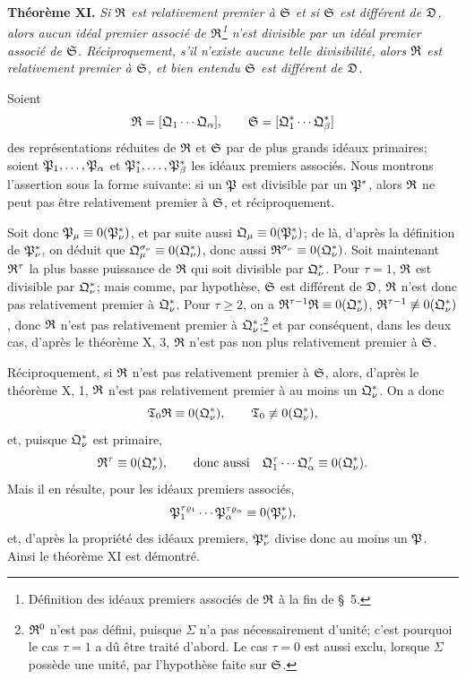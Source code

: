 \textbf{Théorème XI.} \emph{Si $\mathfrak{R}$ est relativement premier à $\mathfrak{S}$ et si $\mathfrak{S}$ est différent de $\mathfrak{D}$, alors aucun idéal premier associé de $\mathfrak{R}$\footnote{Définition des idéaux premiers associés de $\mathfrak{R}$ à la fin de \S~5.} n'est divisible par un idéal premier associé de $\mathfrak{S}$. Réciproquement, s'il n'existe aucune telle divisibilité, alors $\mathfrak{R}$ est relativement premier à $\mathfrak{S}$, et bien entendu $\mathfrak{S}$ est différent de $\mathfrak{D}$.}

Soient
\[
 \mathfrak{R}=[\mathfrak{Q}_1\cdots\mathfrak{Q}_\alpha],\qquad
 \mathfrak{S}=[\mathfrak{Q}_1^*\cdots\mathfrak{Q}_\beta^*]
\]
des représentations réduites de $\mathfrak{R}$ et $\mathfrak{S}$ par de plus grands idéaux primaires; soient $\mathfrak{P}_1,\ldots,\mathfrak{P}_\alpha$ et $\mathfrak{P}_1^*,\ldots,\mathfrak{P}_\beta^*$ les idéaux premiers associés. Nous montrons l'assertion sous la forme suivante: si un $\mathfrak{P}$ est divisible par un $\mathfrak{P}^*$, alors $\mathfrak{R}$ ne peut pas être relativement premier à $\mathfrak{S}$, et réciproquement.

Soit donc $\mathfrak{P}_\mu\equiv0(\mathfrak{P}_\nu^*)$, et par suite aussi $\mathfrak{Q}_\mu\equiv0(\mathfrak{P}_\nu^*)$; de là, d'après la définition de $\mathfrak{P}_\nu^*$, on déduit que $\mathfrak{Q}_\mu^{\sigma_\nu}\equiv0(\mathfrak{Q}_\nu^*)$, donc aussi $\mathfrak{R}^{\sigma_\nu}\equiv0(\mathfrak{Q}_\nu^*)$. Soit maintenant $\mathfrak{R}^\tau$ la plus basse puissance de $\mathfrak{R}$ qui soit divisible par $\mathfrak{Q}_\nu^*$. Pour $\tau=1$, $\mathfrak{R}$ est divisible par $\mathfrak{Q}_\nu^*$; mais comme, par hypothèse, $\mathfrak{S}$ est différent de $\mathfrak{D}$, $\mathfrak{R}$ n'est donc pas relativement premier à $\mathfrak{Q}_\nu^*$. Pour $\tau\ge2$, on a $\mathfrak{R}^{\tau-1}\mathfrak{R}\equiv0(\mathfrak{Q}_\nu^*)$, $\mathfrak{R}^{\tau-1}\not\equiv0(\mathfrak{Q}_\nu^*)$, donc $\mathfrak{R}$ n'est pas relativement premier à $\mathfrak{Q}_\nu^*$;\footnote{$\mathfrak{R}^0$ n'est pas défini, puisque $\Sigma$ n'a pas nécessairement d'unité; c'est pourquoi le cas $\tau=1$ a dû être traité d'abord. Le cas $\tau=0$ est aussi exclu, lorsque $\Sigma$ possède une unité, par l'hypothèse faite sur $\mathfrak{S}$.} et par conséquent, dans les deux cas, d'après le théorème X, 3, $\mathfrak{R}$ n'est pas non plus relativement premier à $\mathfrak{S}$.

Réciproquement, si $\mathfrak{R}$ n'est pas relativement premier à $\mathfrak{S}$, alors, d'après le théorème X, 1, $\mathfrak{R}$ n'est pas relativement premier à au moins un $\mathfrak{Q}_\nu^*$. On a donc
\[
 \mathfrak{T}_0\mathfrak{R}\equiv0(\mathfrak{Q}_\nu^*),\qquad
 \mathfrak{T}_0\not\equiv0(\mathfrak{Q}_\nu^*),
\]
et, puisque $\mathfrak{Q}_\nu^*$ est primaire,
\[
 \mathfrak{R}^\tau\equiv0(\mathfrak{Q}_\nu^*),\qquad
 \text{donc aussi}\quad
 \mathfrak{Q}_1^{\tau}\cdots\mathfrak{Q}_\alpha^{\tau}\equiv0(\mathfrak{Q}_\nu^*).
\]
Mais il en résulte, pour les idéaux premiers associés,
\[
 \mathfrak{P}_1^{\tau\varrho_1}\cdots\mathfrak{P}_\alpha^{\tau\varrho_\alpha}\equiv0(\mathfrak{P}_\nu^*),
\]
et, d'après la propriété des idéaux premiers, $\mathfrak{P}_\nu^*$ divise donc au moins un $\mathfrak{P}$. Ainsi le théorème XI est démontré.


